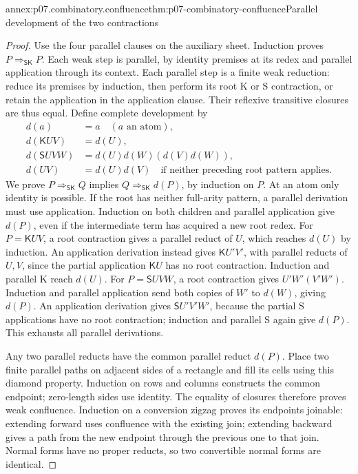 \begin{annexitem}{annex:p07.combinatory.confluence}{thm:p07-combinatory-confluence}{Parallel development of the two contractions}
\begin{proof}
Use the four parallel clauses on the auxiliary sheet.  Induction proves
\(P\Rightarrow_{\mathsf{SK}}P\).  Each weak step is parallel, by identity
premises at its redex and parallel application through its context.  Each
parallel step is a finite weak reduction: reduce its premises by induction,
then perform its root K or S contraction, or retain the application in the
application clause.  Their reflexive transitive closures are thus equal.
Define complete development by
\[
\begin{aligned}
 d(a)&=a\quad(a\text{ an atom}),\\
 d(\mathsf KUV)&=d(U),\\
 d(\mathsf SUVW)&=d(U)d(W)(d(V)d(W)),\\
 d(UV)&=d(U)d(V)\quad\text{if neither preceding root pattern applies}.
\end{aligned}
\]
We prove \(P\Rightarrow_{\mathsf{SK}}Q\) implies
\(Q\Rightarrow_{\mathsf{SK}}d(P)\), by induction on \(P\).
At an atom only identity is possible.  If the root has neither full-arity
pattern, a parallel derivation must use application.  Induction on both children
and parallel application give \(d(P)\), even if the intermediate term has
acquired a new root redex.
For \(P=\mathsf KUV\), a root contraction gives a parallel reduct of \(U\),
which reaches \(d(U)\) by induction.  An application derivation instead gives
\(\mathsf KU'V'\), with parallel reducts of \(U,V\), since the partial
application \(\mathsf KU\) has no root contraction.  Induction and parallel
K reach \(d(U)\).
For \(P=\mathsf SUVW\), a root contraction gives \(U'W'(V'W')\).
Induction and parallel application send both copies of \(W'\) to \(d(W)\),
giving \(d(P)\).  An application derivation gives \(\mathsf SU'V'W'\), because
the partial S applications have no root contraction; induction and parallel S
again give \(d(P)\).  This exhausts all parallel derivations.

Any two parallel reducts have the common parallel reduct \(d(P)\).
Place two finite parallel paths on adjacent sides of a rectangle and fill its
cells using this diamond property.  Induction on rows and columns constructs
the common endpoint; zero-length sides use identity.  The equality of closures
therefore proves weak confluence.  Induction on a conversion zigzag proves its
endpoints joinable: extending forward uses confluence with the existing join;
extending backward gives a path from the new endpoint through the previous one
to that join.  Normal forms have no proper reducts, so two convertible normal
forms are identical.
\end{proof}
\end{annexitem}

